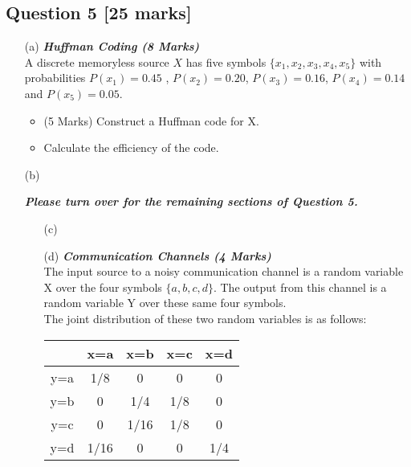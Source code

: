 \subsection*{Question 5 [25 marks] }
\begin{itemize}
\item[(a)] \textbf{\textit{Huffman Coding (8 Marks)}}\\
A discrete memoryless source $X$ has five symbols $\{x_1,x_2,x_3,x_4,x_5\}$ with probabilities $P(x_1) = 0.45$ , $P(x_2) = 0.20$, $P(x_3) = 0.16$, $P(x_4) = 0.14$ and $P(x_5) = 0.05$.

\begin{itemize}
\item (5 Marks) Construct a Huffman code for X.
\item  Calculate the efficiency of the code.
\end{itemize}
\bigskip
\item[(b)] 

{
\normalsize
\textit{\textbf{Please turn over for the remaining sections of Question 5.}}
}

\newpage
\begin{itemize}
\item[(c)]


\item[(d)] \textbf{\textit{Communication Channels (4 Marks)}}\\
The input source to a noisy communication channel is a random variable X over the
four symbols $\{a, b, c, d\}$. The output from this channel is a random variable Y over these same
four symbols. \\
\vspace{0.3cm}
\noindent 
The joint distribution of these two random variables is as follows:\\ \bigskip

\begin{center}
\begin{tabular}{|c|c|c|c|c|}
\hline
&x=a& x=b & x=c & x=d \\ \hline
y=a &1/8 &0 &0 & 0 \\ \hline
y=b &0 & 1/4& 1/8& 0 \\ \hline
y=c & 0&1/16 & 1/8 & 0\\ \hline
y=d & 1/16& 0& 0 & 1/4\\ \hline
\end{tabular}
\end{center}


\end{itemize}
\end{itemize}
